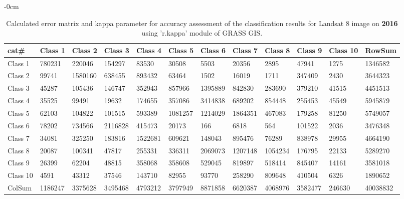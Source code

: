 \documentclass[analytics,article,submit,pdftex,moreauthors]{Definitions/mdpi}
\begin{document}
\begin{table}[H] 
\footnotesize
    \centering
    \begin{adjustwidth}{-\extralength}{0cm}
    \caption{Calculated error matrix and kappa parameter for accuracy assessment of the classification results for Landsat 8 image on \textbf{2016} using 'r.kappa' module of GRASS GIS.\label{tab03}}
 	\begin{tabularx}{\fulllength}{|l|l|l|l|l|l|l|l|l|l|l|l|}
    \toprule
        cat\# & \textbf{Class 1} & \textbf{Class 2} & \textbf{Class 3} & \textbf{Class 4} & \textbf{Class 5} & \textbf{Class 6} & \textbf{Class 7} & \textbf{Class 8} & \textbf{Class 9} & \textbf{Class 10} & \textbf{RowSum} \\ \hline
        Class 1 & \cellcolor{green!10}780231 & 220046 & 154297 & 83530 & 30508 & 5503 & 20356 & 2895 & 47941 & 1275 & 1346582 \\ \hline
        Class 2 & 99741 & \cellcolor{green!10}1580160 & 638455 & 893432 & 63464 & 1502 & 16019 & 1711 & 347409 & 2430 & 3644323 \\ \hline
        Class 3 & 45287 & 105436 & \cellcolor{green!10}146747 & 352943 & 857966 & 1395889 & 842830 & 283690 & 379210 & 41515 & 4451513 \\ \hline
        Class 4 & 35525 & 99491 & 19632 & \cellcolor{green!10}174655 & 357086 & 3414838 & 689202 & 854448 & 255453 & 45549 & 5945879 \\ \hline
        Class 5 & 62103 & 104822 & 101515 & 593389 & \cellcolor{green!10}1081257 & 1214029 & 1864351 & 467083 & 179258 & 81250 & 5749057 \\ \hline
        Class 6 & 78202 & 734566 & 2116828 & 415473 & 20173 & \cellcolor{green!10}166 & 6818 & 564 & 101522 & 2036 & 3476348 \\ \hline
        Class 7 & 34081 & 325250 & 183816 & 1522681 & 609621 & 148043 & \cellcolor{green!10}895476 & 76289 & 838978 & 29955 & 4664190 \\ \hline
        Class 8 & 20087 & 100341 & 47817 & 255331 & 336311 & 2069073 & 1207148 & \cellcolor{green!10}1054234 & 176795 & 22133 & 5289270 \\ \hline
        Class 9 & 26399 & 62204 & 48815 & 358068 & 358608 & 529045 & 819897 & 518414 & \cellcolor{green!10}845407 & 14161 & 3581018 \\ \hline
        Class 10 & 4591 & 43312 & 37546 & 143710 & 82955 & 93770 & 258290 & 809648 & 410504 & \cellcolor{green!10}6326 & 1890652 \\ \hline
        ColSum & 1186247 & 3375628 & 3495468 & 4793212 & 3797949 & 8871858 & 6620387 & 4068976 & 3582477 & 246630 & \cellcolor{green!10}40038832 \\ \hline
        \bottomrule
    \end{tabularx}
    \end{adjustwidth}
\end{table}
\end{document}
